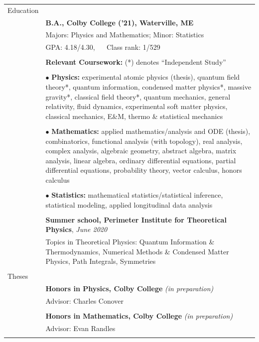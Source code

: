 \documentclass[10pt]{article}
\begin{document}
\noindent \begin{longtable}{ l p{14.7cm}   }

	
  \large{Education}    	& \\ 
  						& \textbf{B.A., Colby College ('21), Waterville, ME} \\
     				 	& Majors: Physics and Mathematics; Minor: Statistics  \\
     					& GPA: 4.18/4.30, $\quad$ Class rank: 1/529 \\
	 					& \\ 

	 					
	 					& \textbf{Relevant Coursework:} (*) denotes ``Independent Study'' \\ \vspace{-12pt}
	 					& \\
	 					& $\bullet$ \textbf{Physics:} experimental atomic physics (thesis), quantum field theory*, quantum information, condensed matter physics*, massive gravity*, classical field theory*, quantum mechanics,  general relativity, fluid dynamics, experimental soft matter physics, classical mechanics, E\&M, thermo \& statistical mechanics\\  \vspace{-9pt}
	 					& \\
	 					& $\bullet$ \textbf{Mathematics:} applied mathematics/analysis and ODE (thesis), combinatorics, functional analysis (with topology), real analysis, complex analysis, algebraic geometry, abstract algebra, matrix analysis, linear algebra, ordinary differential equations, partial differential equations, probability theory, vector calculus, honors calculus\\   \vspace{-9pt}
	 					& \\ 
	 					& $\bullet$ \textbf{Statistics:} mathematical statistics/statistical inference,  statistical modeling, applied longitudinal data analysis\\
	 					& \\
	 					
	 					
	 					&\textbf{Summer school, Perimeter Institute for Theoretical Physics}, \textit{June 2020} \\
						& Topics in Theoretical Physics: Quantum Information \& Thermodynamics, Numerical Methods \& Condensed Matter Physics, Path Integrals, Symmetries \\
						&\\
						
						
\large{Theses}
&\\
& \textbf{Honors in Physics, Colby College} \textit{(in preparation)}\\
& Advisor: Charles Conover\\
& \\
& \textbf{Honors in Mathematics, Colby College} \textit{(in preparation)}\\
& Advisor: Evan Randles\\
&\\ 
    

\end{longtable}
\end{document}

